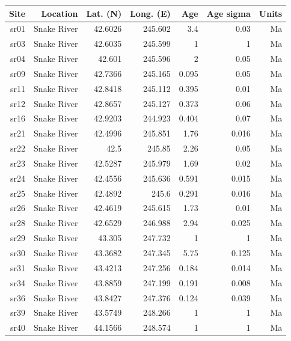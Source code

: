 \documentclass{article}
\begin{document}
\begin{longtable}{rrrrrrr}
\hline
Site & Location & Lat. (N) & Long. (E) & Age  & Age sigma & Units\\
\hline
sr01 & Snake River & 42.6026 & 245.602 & 3.4 & 0.03 & Ma\\
sr03 & Snake River & 42.6035 & 245.599 & 1 & 1 & Ma\\
sr04 & Snake River & 42.601 & 245.596 & 2 & 0.05 & Ma\\
sr09 & Snake River & 42.7366 & 245.165 & 0.095 & 0.05 & Ma\\
sr11 & Snake River & 42.8418 & 245.112 & 0.395 & 0.01 & Ma\\
sr12 & Snake River & 42.8657 & 245.127 & 0.373 & 0.06 & Ma\\
sr16 & Snake River & 42.9203 & 244.923 & 0.404 & 0.07 & Ma\\
sr21 & Snake River & 42.4996 & 245.851 & 1.76 & 0.016 & Ma\\
sr22 & Snake River & 42.5 & 245.85 & 2.26 & 0.05 & Ma\\
sr23 & Snake River & 42.5287 & 245.979 & 1.69 & 0.02 & Ma\\
sr24 & Snake River & 42.4556 & 245.636 & 0.591 & 0.015 & Ma\\
sr25 & Snake River & 42.4892 & 245.6 & 0.291 & 0.016 & Ma\\
sr26 & Snake River & 42.4619 & 245.615 & 1.73 & 0.01 & Ma\\
sr28 & Snake River & 42.6529 & 246.988 & 2.94 & 0.025 & Ma\\
sr29 & Snake River & 43.305 & 247.732 & 1 & 1 & Ma\\
sr30 & Snake River & 43.3682 & 247.345 & 5.75 & 0.125 & Ma\\
sr31 & Snake River & 43.4213 & 247.256 & 0.184 & 0.014 & Ma\\
sr34 & Snake River & 43.8859 & 247.199 & 0.191 & 0.008 & Ma\\
sr36 & Snake River & 43.8427 & 247.376 & 0.124 & 0.039 & Ma\\
sr39 & Snake River & 43.5749 & 248.266 & 1 & 1 & Ma\\
sr40 & Snake River & 44.1566 & 248.574 & 1 & 1 & Ma\\
\hline
\end{longtable}
\end{document}
